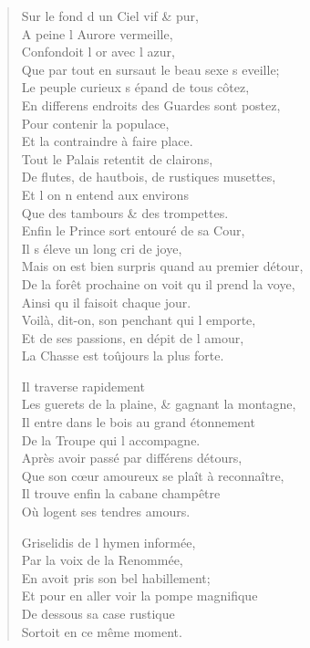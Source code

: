 \begin{verse}
\vin Sur le fond d\textquotesingle{} un Ciel vif \& pur, \\
\vin A peine l\textquotesingle{} Aurore vermeille, \\
\vin Confondoit l\textquotesingle{} or avec l\textquotesingle{} azur, \\
Que par tout en sursaut le beau sexe s\textquotesingle{} eveille; \\
Le peuple curieux s\textquotesingle{} épand de tous côtez, \\
En differens endroits des Guardes sont postez, \\
\vin Pour contenir la populace, \\
\vin Et la contraindre à faire place. \\
\vin Tout le Palais retentit de clairons, \\
De flutes, de hautbois, de rustiques musettes, \\
\vin Et l\textquotesingle{} on n\textquotesingle{} entend aux environs \\
\vin Que des tambours \& des trompettes. \\
Enfin le Prince sort entouré de sa Cour, \\
\vin Il s\textquotesingle{} éleve un long cri de joye, \\
Mais on est bien surpris quand au premier détour, \\
De la forêt prochaine on voit qu\textquotesingle{} il prend la voye, \\
\vin Ainsi qu\textquotesingle{} il faisoit chaque jour. \\
\vin Voilà, dit-on, son penchant qui l\textquotesingle{} emporte, \\
Et de ses passions, en dépit de l\textquotesingle{} amour, \\
\vin La Chasse est toûjours la plus forte.

\vin Il traverse rapidement \\
Les guerets de la plaine, \& gagnant la montagne, \\
Il entre dans le bois au grand étonnement \\
\vin De la Troupe qui l\textquotesingle{} accompagne. \\
Après avoir passé par différens détours, \\
Que son cœur amoureux se plaît à reconnaître, \\
\vin Il trouve enfin la cabane champêtre \\
\vin Où logent ses tendres amours.

\vin Griselidis de l\textquotesingle{} hymen informée, \\
\vin Par la voix de la Renommée, \\
\vin En avoit pris son bel habillement; \\
Et pour en aller voir la pompe magnifique \\
\vin De dessous sa case rustique \\
\vin Sortoit en ce même moment.


\end{verse}
